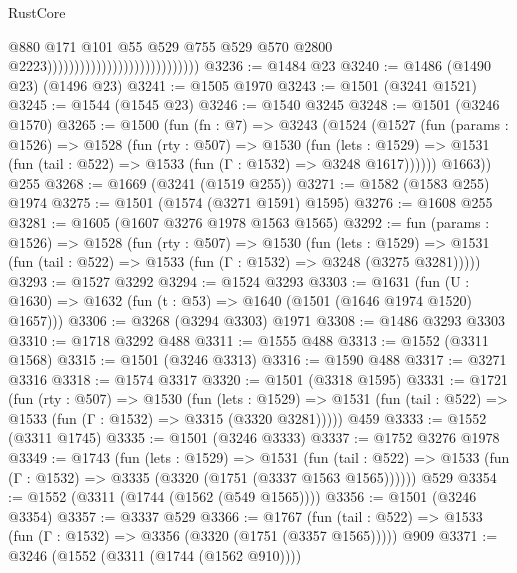 \begin{lexlean}{RustCore}
\begin{coremodule}
                                                            @880
                                                            @171
                                                            @101
                                                            @55
                                                            @529
                                                            @755
                                                            @529
                                                            @570
                                                            @2800
                                                            @2223))))))))))))))))))))))))))))
@3236 := @1484 @23
@3240 := @1486 (@1490 @23) (@1496 @23)
@3241 := @1505 @1970
@3243 := @1501 (@3241 @1521)
@3245 := @1544 (@1545 @23)
@3246 := @1540 @3245
@3248 := @1501 (@3246 @1570)
@3265 := @1500
    (fun (fn : @7) =>
    @3243
      (@1524
        (@1527
          (fun (params : @1526) =>
          @1528
            (fun (rty : @507) =>
            @1530
              (fun (lets : @1529) =>
              @1531 (fun (tail : @522) => @1533 (fun (Γ : @1532) => @3248 @1617))))))
        @1663))
    @255
@3268 := @1669 (@3241 (@1519 @255))
@3271 := @1582 (@1583 @255) @1974
@3275 := @1501 (@1574 (@3271 @1591) @1595)
@3276 := @1608 @255
@3281 := @1605 (@1607 @3276 @1978 @1563 @1565)
@3292 := fun (params : @1526) =>
  @1528
    (fun (rty : @507) =>
    @1530
      (fun (lets : @1529) =>
      @1531 (fun (tail : @522) => @1533 (fun (Γ : @1532) => @3248 (@3275 @3281)))))
@3293 := @1527 @3292
@3294 := @1524 @3293
@3303 := @1631 (fun (U : @1630) => @1632 (fun (t : @53) => @1640 (@1501 (@1646 @1974 @1520) @1657)))
@3306 := @3268 (@3294 @3303) @1971
@3308 := @1486 @3293 @3303
@3310 := @1718 @3292 @488
@3311 := @1555 @488
@3313 := @1552 (@3311 @1568)
@3315 := @1501 (@3246 @3313)
@3316 := @1590 @488
@3317 := @3271 @3316
@3318 := @1574 @3317
@3320 := @1501 (@3318 @1595)
@3331 := @1721
    (fun (rty : @507) =>
    @1530
      (fun (lets : @1529) =>
      @1531 (fun (tail : @522) => @1533 (fun (Γ : @1532) => @3315 (@3320 @3281)))))
    @459
@3333 := @1552 (@3311 @1745)
@3335 := @1501 (@3246 @3333)
@3337 := @1752 @3276 @1978
@3349 := @1743
    (fun (lets : @1529) =>
    @1531
      (fun (tail : @522) => @1533 (fun (Γ : @1532) => @3335 (@3320 (@1751 (@3337 @1563 @1565))))))
    @529
@3354 := @1552 (@3311 (@1744 (@1562 (@549 @1565))))
@3356 := @1501 (@3246 @3354)
@3357 := @3337 @529
@3366 := @1767
    (fun (tail : @522) => @1533 (fun (Γ : @1532) => @3356 (@3320 (@1751 (@3357 @1565)))))
    @909
@3371 := @3246 (@1552 (@3311 (@1744 (@1562 @910))))

\end{coremodule}
\end{lexlean}
